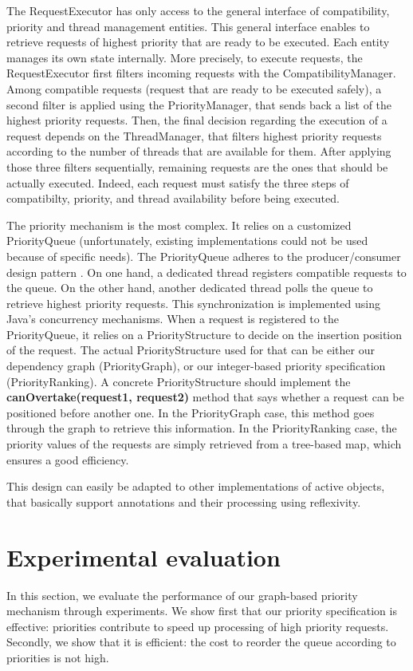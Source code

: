 \documentclass[11pt]{report}
\begin{document}
The RequestExecutor has only access to the general interface of compatibility, priority and thread management entities. This general interface enables to retrieve requests of highest priority that are ready to be executed. Each entity manages its own state internally. More precisely, to execute requests, the RequestExecutor first filters incoming requests with the CompatibilityManager. Among compatible requests (request that are ready to be executed safely), a second filter is applied using the PriorityManager, that sends back a list of the highest priority requests. Then, the final decision regarding the execution of a request depends on the ThreadManager, that filters highest priority requests according to the number of threads that are available for them. After applying those three filters sequentially, remaining requests are the ones that should be actually executed. Indeed, each request must satisfy the three steps of compatibilty, priority, and thread availability before being executed. 

The priority mechanism is the most complex. It relies on a customized PriorityQueue (unfortunately, existing implementations could not be used because of specific needs). The PriorityQueue adheres to the producer/consumer design pattern \cite{ref:producerconsumer}. On one hand, a dedicated thread registers compatible requests to the queue. On the other hand, another dedicated thread polls the queue to retrieve highest priority requests. This synchronization is implemented using Java's concurrency mechanisms. When a request is registered to the PriorityQueue, it relies on a PriorityStructure to decide on the insertion position of the request. The actual PriorityStructure used for that can be either our dependency graph (PriorityGraph), or our integer-based priority specification (PriorityRanking). A concrete PriorityStructure should implement the \textbf{canOvertake(request1, request2)} method that says whether a request can be positioned before another one. In the PriorityGraph case, this method goes through the graph to retrieve this information. In the PriorityRanking case, the priority values of the requests are simply retrieved from a tree-based map, which ensures a good efficiency.

This design can easily be adapted to other implementations of active objects, that basically support annotations and their processing using reflexivity. 


\section{Experimental evaluation}\label{sec:experiments}
In this section, we evaluate the performance of our graph-based priority mechanism through experiments. 
We show first that our priority specification is effective: priorities contribute to speed up processing of high priority requests. Secondly, we show that it is efficient: the cost to reorder the queue according to priorities is not high.
\end{document}
